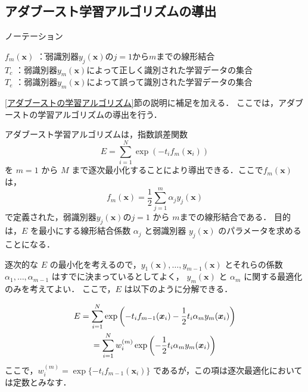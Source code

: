 \documentclass[dvipdfmx]{jreport}
\begin{document}
\subsection{アダブースト学習アルゴリズムの導出}
\begin{itembox}[l]{\large{ノーテーション}}
    \begin{tabbing}
        \hspace{15pt} \raisebox{0.5ex}{\tiny $\bullet$} $f_m(\bm{x})$ \=：弱識別器$y_j(\bm{x})$の$j=1$から$m$までの線形結合\\[0.5em]
        \hspace{15pt} \raisebox{0.5ex}{\tiny $\bullet$} $T_c$ \>：弱識別器$y_m(\bm{x})$によって正しく識別された学習データの集合 \\[0.5em]
        \hspace{15pt} \raisebox{0.5ex}{\tiny $\bullet$} $T_e$ \>：弱識別器$y_m(\bm{x})$によって誤って識別された学習データの集合
    \end{tabbing}
\end{itembox}

\ref{アダブーストの学習アルゴリズム}節の説明に補足を加える．
ここでは，アダブーストの学習アルゴリズムの導出を行う．

アダブースト学習アルゴリズムは，指数誤差関数
\begin{equation}
E = \sum_{i=1}^{N} \exp\left(-t_i f_m(\bm{x}_i)\right)\label{eq:26}
\end{equation}
を $m = 1$ から $M$ まで逐次最小化することにより導出できる．ここで$f_m(\bm{x})$ は，
\begin{equation}
f_m(\bm{x}) = \frac{1}{2} \sum_{j=1}^{m} \alpha_j y_j(\bm{x})\label{eq:27}
\end{equation}
で定義された，弱識別器$y_j(\bm{x})$の$j = 1$ から $m$までの線形結合である．
目的は，$E$ を最小にする線形結合係数 $\alpha_j$ と弱識別器 $y_j(\bm{x})$ のパラメータを求めることになる．

逐次的な $E$ の最小化を考えるので，$y_1(\bm{x}), \ldots, y_{m-1}(\bm{x})$ とそれらの係数 $\alpha_1, \ldots, \alpha_{m-1}$ はすでに決まっているとしてよく，
$y_m(\bm{x})$ と $\alpha_m$ に関する最適化のみを考えてよい．
ここで，$E$ は以下のように分解できる．

\begin{gather}
E = \sum_{i=1}^{N} \exp\left(-t_i f_{m-1}(\bm{x}_i) - \frac{1}{2} t_i \alpha_m y_m(\bm{x}_i)\right)\notag \\
= \sum_{i=1}^{N} w_i^{(m)} \exp\left(-\frac{1}{2} t_i \alpha_m y_m(\bm{x}_i)\right)\label{eq:28}
\end{gather}
ここで，$w_i^{(m)} = \exp\{-t_i f_{m-1}(\bm{x}_i)\}$ であるが，この項は逐次最適化においては定数とみなす．
\end{document}
